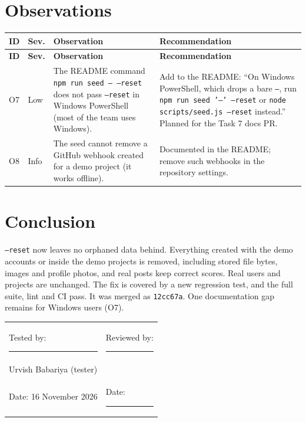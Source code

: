 \documentclass[11pt,a4paper]{article}
\begin{document}
\section{Observations}
{\small{}
\begin{xltabular}{\linewidth}{l l X X}\toprule
\textbf{ID} & \textbf{Sev.} & \textbf{Observation} & \textbf{Recommendation}\\\midrule\endfirsthead
\toprule\textbf{ID} & \textbf{Sev.} & \textbf{Observation} & \textbf{Recommendation}\\\midrule\endhead
O7 & Low & The README command \texttt{npm run seed -- --reset} does not pass \texttt{--reset} in Windows PowerShell (most of the team uses Windows). &
Add to the README: ``On Windows PowerShell, which drops a bare \texttt{--}, run \texttt{npm run seed '--' --reset} or \texttt{node scripts/seed.js --reset} instead.''
Planned for the Task 7 docs PR. \\
O8 & Info & The seed cannot remove a GitHub webhook created for a demo project (it works offline). & Documented in the README; remove such webhooks in the repository settings. \\
\bottomrule\end{xltabular}}

\section{Conclusion}
\texttt{--reset} now leaves no orphaned data behind. Everything created with the demo accounts or inside the demo projects is removed,
including stored file bytes, images and profile photos, and real posts keep correct scores. Real users and projects are unchanged.
The fix is covered by a new regression test, and the full suite, lint and CI pass. It was merged as \texttt{12cc67a}.
One documentation gap remains for Windows users (O7).

\vspace{1cm}\noindent
\begin{tabularx}{\linewidth}{X X}
Tested by: \rule{5cm}{0.4pt} & Reviewed by: \rule{5cm}{0.4pt}\\[2pt]
Urvish Babariya (tester) & \\[14pt]
Date: 16 November 2026 & Date: \rule{3.5cm}{0.4pt}\\
\end{tabularx}
\end{document}
